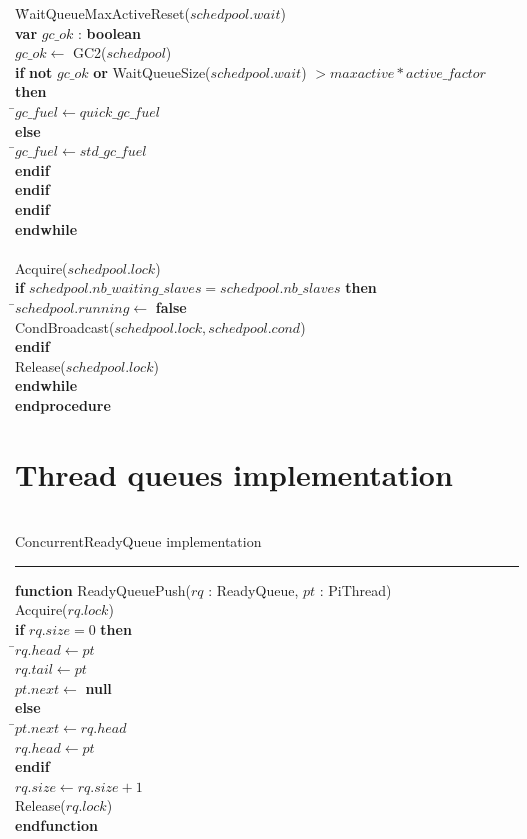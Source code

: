 \documentclass[a4paper,11pt]{article}
\newenvironment{program}{
  \begin{sffamily}
  \begin{scriptsize}
  \begin{tabbing}}
 {\end{tabbing}
  \end{scriptsize}
  \end{sffamily}}
\newcommand{\kw}[1]{\textsf{\textbf{#1}}}
\newcommand{\pindent}{\hspace{2em}\=}
\newcommand{\synchro}[1]{\textcolor{synchrocolor}{#1}}
\newcommand{\algotitle}[1]{\noindent\\ \noindent#1\par\nobreak\vspace{3pt}\hrule\vspace{6pt}}
\newcommand{\algosection}[1]{
  \phantomsection
  \algotitle{#1}
}
\begin{document}
\begin{program}
  \>\>\>\>\pindent WaitQueueMaxActiveReset($schedpool.wait$) \\
  \>\>\>\>\>\kw{var} $gc\_ok$ : \kw{boolean} \\
  \>\>\>\>\>$gc\_ok \leftarrow$ GC2($schedpool$) \\
  \>\>\>\>\>\kw{if} \kw{not} $gc\_ok$ \kw{or} WaitQueueSize($schedpool.wait$) $> maxactive * active\_factor$ \kw{then} \\
  \>\>\>\>\>\pindent$gc\_fuel \leftarrow quick\_gc\_fuel$ \\
  \>\>\>\>\>\kw{else} \\
  \>\>\>\>\>\pindent$gc\_fuel \leftarrow std\_gc\_fuel$ \\
  \>\>\>\>\>\kw{endif} \\
  \>\>\>\>\kw{endif} \\
  \>\>\>\kw{endif} \\
  \>\>\kw{endwhile} \\
  \>\> \\
  \>\>\synchro{Acquire($schedpool.lock$)} \\
  \>\>\kw{if} $schedpool.nb\_waiting\_slaves = schedpool.nb\_slaves$ \kw{then} \\
  \>\>\pindent $schedpool.running \leftarrow$ \kw{false} \\
  \>\>\synchro{CondBroadcast($schedpool.lock, schedpool.cond$)} \\
  \>\>\kw{endif} \\
  \>\>\synchro{Release($schedpool.lock$)} \\
  \>\kw{endwhile} \\
  \kw{endprocedure}
\end{program}

\section{Thread queues implementation}

\algosection{ConcurrentReadyQueue implementation}

\label{ReadyQueuePush}
\begin{program}
  \kw{function} ReadyQueuePush($rq$ : ReadyQueue, $pt$ : PiThread) \\
  \pindent\synchro{Acquire($rq.lock$)} \\
  \>\kw{if} $rq.size = 0$ \kw{then} \\
  \>\pindent$rq.head \leftarrow pt$ \\
  \>\>$rq.tail \leftarrow pt$ \\
  \>\>$pt.next \leftarrow$ \kw{null} \\
  \>\kw{else} \\
  \>\pindent$pt.next \leftarrow rq.head$ \\
  \>\>$rq.head \leftarrow pt$ \\
  \>\kw{endif} \\
  \>$rq.size \leftarrow rq.size + 1$ \\
  \>\synchro{Release($rq.lock$)} \\
  \kw{endfunction}
\end{program}
\end{document}
